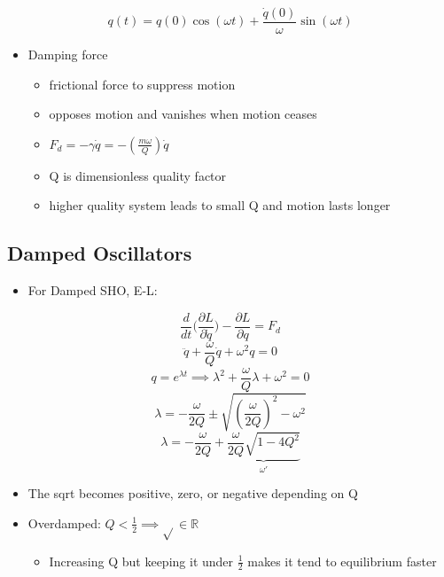 \documentclass[a4paper,11pt,normalem]{article}
\begin{document}
\[
    q(t) = q(0)\cos(\omega t) + \frac{\dot{q}(0)}{\omega}\sin(\omega t)
\]

\begin{itemize}
\item
  Damping force
  \begin{itemize}
  \item
    frictional force to suppress motion
  \item
    opposes motion and vanishes when motion ceases
  \item
    \(F_d = -\gamma\dot{q} = -(\frac{m\omega}{Q})\dot{q}\)
  \item
    Q is dimensionless quality factor
  \item
    higher quality system leads to small Q and motion lasts longer
  \end{itemize}
\end{itemize}

\subsection{Damped Oscillators}\label{damped-oscillators}

\begin{itemize}
\item
  For Damped SHO, E-L:
\end{itemize}

\[
    \frac{d}{dt}\Big(\frac{\partial L}{\partial \dot{q}}\Big) - \frac{\partial L}{\partial q} = F_d \]
\[
    \ddot{q} + \frac{\omega}{Q}\dot{q} + \omega^2 q = 0 \] \[
    q = e^{\lambda t} \implies \lambda^2 + \frac{\omega}{Q}\lambda + \omega^2 = 0 \]
\[
    \lambda = -\frac{\omega}{2Q} \pm \sqrt{(\frac{\omega}{2Q})^2 - \omega^2} \]
\[
    \lambda = -\frac{\omega}{2Q} + \underbrace{\frac{\omega}{2Q}\sqrt{1 - 4Q^2}}_{\omega '}
\]

\begin{itemize}
\item
  The sqrt becomes positive, zero, or negative depending on Q
\item
  Overdamped: \(Q < \frac{1}{2} \implies \sqrt{} \in \mathbb{R}\)

  \begin{itemize}

  \item
    Increasing Q but keeping it under \(\frac{1}{2}\) makes it tend to
    equilibrium faster
  \end{itemize}
\end{itemize}
\end{document}
